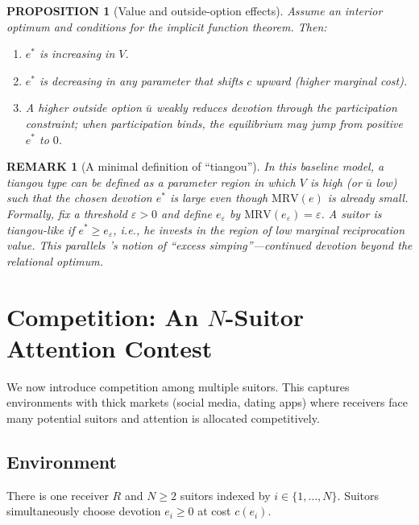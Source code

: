 \documentclass[AER]{AEA}
\newtheorem{proposition}{PROPOSITION}
\newtheorem{remark}{REMARK}
\begin{document}
\begin{proposition}[Value and outside-option effects]\label{prop:compstat}
  Assume an interior optimum and conditions for the implicit function theorem. Then:
  \begin{enumerate}
    \item $e^*$ is increasing in $V$.
    \item $e^*$ is decreasing in any parameter that shifts $c$ upward (higher marginal
      cost).
    \item A higher outside option $\bar{u}$ weakly reduces devotion through the
      participation constraint; when participation binds, the equilibrium may jump from
      positive $e^*$ to $0$.
  \end{enumerate}
\end{proposition}

\begin{remark}[A minimal definition of ``tiangou'']\label{rem:tiangou}
  In this baseline model, a tiangou type can be defined as a parameter region in which
  $V$ is high (or $\bar{u}$ low) such that the chosen devotion $e^*$ is large even though
  $\mathrm{MRV}(e)$ is already small. Formally, fix a threshold $\varepsilon > 0$ and
  define $e_\varepsilon$ by $\mathrm{MRV}(e_\varepsilon) = \varepsilon$. A suitor is
  tiangou-like if $e^* \geq e_\varepsilon$, i.e., he invests in the region of low
  marginal reciprocation value. This parallels \citet{Price2026}'s notion of ``excess
  simping''---continued devotion beyond the relational optimum.
\end{remark}

\section{Competition: An $N$-Suitor Attention Contest}

We now introduce competition among multiple suitors. This captures environments with
thick markets (social media, dating apps) where receivers face many potential suitors and
attention is allocated competitively.

\subsection{Environment}

There is one receiver $R$ and $N \geq 2$ suitors indexed by $i \in \{1, \ldots, N\}$.
Suitors simultaneously choose devotion $e_i \geq 0$ at cost $c(e_i)$.
\end{document}
